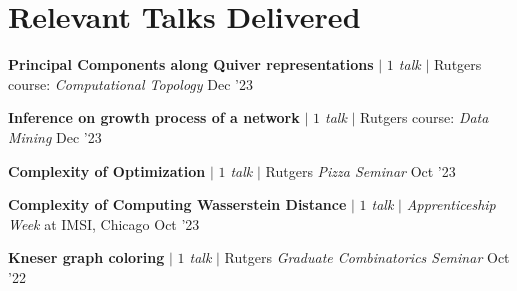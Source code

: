 \vspace{-20pt}
\section{Relevant Talks Delivered}
\resumeSubHeadingListStart

\resumeProjectHeading
{\textbf{Principal Components along Quiver representations} $|$ \emph{$1$ talk} $|$ Rutgers course: \textit {Computational Topology}}
{Dec '23}
{}
\vspace{\mygap}

\resumeProjectHeading
{\textbf{Inference on growth process of a network} $|$ \emph{$1$ talk} $|$ Rutgers course: \textit{Data Mining}}
{Dec '23}
{}
\vspace{\mygap}


\resumeProjectHeading
{\textbf{Complexity of Optimization} $|$ \emph{$1$ talk} $|$ Rutgers \textit{Pizza Seminar}}
{Oct '23}
{}
\vspace{\mygap}

\resumeProjectHeading
{\textbf{Complexity of Computing Wasserstein Distance} $|$ \emph{$1$ talk} $|$ \textit{Apprenticeship Week} at IMSI, Chicago }
{Oct '23}
{}
\vspace{\mygap}



%
%
%

\resumeProjectHeading
{\textbf{Kneser graph coloring} $|$ \emph{$1$ talk} $|$ Rutgers \textit{Graduate Combinatorics Seminar}}
{Oct '22}
{}
\vspace{\mygap}


